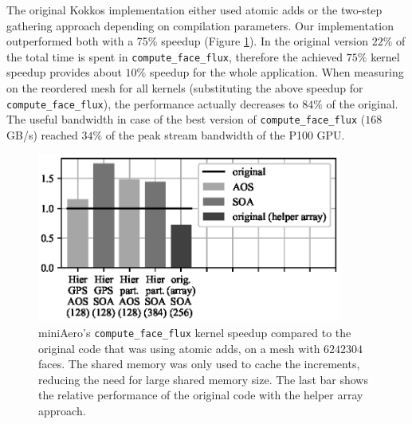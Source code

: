 The original Kokkos implementation either used atomic adds or the two-step
gathering approach depending on compilation parameters. Our implementation
outperformed both with a 75\% speedup (Figure
\ref{fig:mini_aero_speedup_small-cache}). In the original version $22\%$ of the
total time is spent in \texttt{compute\_face\_flux}, therefore the achieved
$75\%$ kernel speedup provides about $10\%$ speedup for the whole application.
When measuring on the reordered mesh for all kernels (substituting the above
speedup for \texttt{compute\_face\_flux}), the performance actually decreases to
$84\%$ of the original.  The useful bandwidth in case of the best version of
\texttt{compute\_face\_flux} ($168$ GB/s) reached $34\%$ of the peak stream
bandwidth of the P100 GPU.

\begin{figure}[Htbp]
\centering
\includegraphics[width=10cm]{fig/mini_aero_speedup_nocache.eps}
\caption{miniAero's \texttt{compute\_face\_flux} kernel speedup compared to 
the original code that was using atomic adds, on a mesh with $6242304$ faces. 
The shared memory was only used to cache the increments, reducing the need 
for large shared memory size. The last bar shows the relative performance of 
the original code with the helper array approach.}
\label{fig:mini_aero_speedup_small-cache}
\end{figure}

